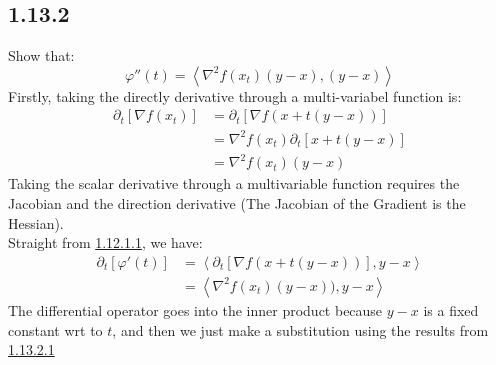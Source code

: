 \documentclass[]{article}
\begin{document}
    \subsection*{1.13.2}
        Show that: 
        $$
            \varphi''(t) = \left\langle \nabla^2f(x_t)(y - x), (y - x) \right\rangle
        $$
        Firstly, taking the directly derivative through a multi-variabel function is: 
        \begin{align*}\tag{1.13.2.1}\label{eqn:1.13.2.1}
            \partial_t[\nabla f(x_t)] &= 
            \partial_t[\nabla f(x + t(y - x))]
            \\
            &= \nabla^2f(x_t)\partial_t[x + t(y - x)] 
            \\
            &= \nabla^2 f(x_t)(y - x)
        \end{align*}
        Taking the scalar derivative through a multivariable function requires the Jacobian and the direction derivative (The Jacobian of the Gradient is the Hessian).
        \\
        Straight from \hyperref[eqn:1.12.1.1]{1.12.1.1}, we have: 
        \begin{align*}\tag{1.13.2.2}\label{eqn:1.13.2.2}
            \partial_t[\varphi'(t)]&= \left\langle 
                \partial_t[\nabla f(x + t(y - x))], y - x
            \right\rangle
            \\
            &= 
            \left\langle 
                \nabla^2f(x_t)(y - x)) , y - x
            \right\rangle
        \end{align*}
        The differential operator goes into the inner product because $y - x$ is a fixed constant wrt to $t$, and then we just make a substitution using the results from \hyperref[eqn:1.13.2.1]{1.13.2.1}
\end{document}

